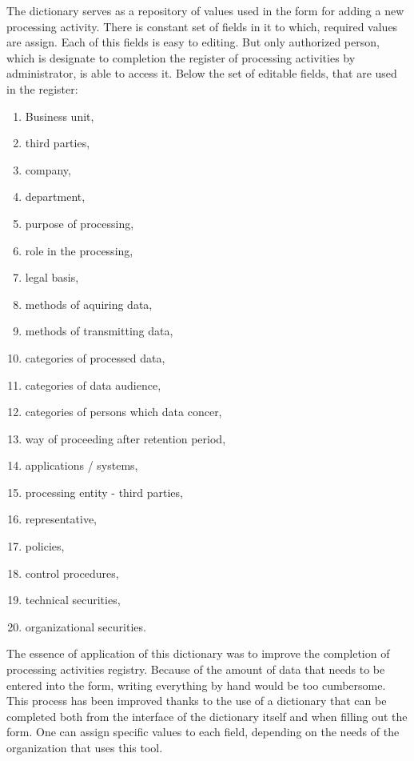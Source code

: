 \documentclass[en, noamssymb]{mgr}
\begin{document}
The dictionary serves as a repository of values used in the form for adding a new processing activity. There is constant set of fields in it to which, required values are assign. Each of this fields is easy to editing. But only authorized person, which is designate to completion the register of processing activities by administrator, is able to access it. Below the set of editable fields, that are used in the register: 

\begin{enumerate}

\item Business unit,
\item third parties,
\item company,
\item department,
\item purpose of processing,
\item role in the processing,
\item legal basis,
\item methods of aquiring data,
\item methods of transmitting data,
\item categories of processed data,
\item categories of data audience,
\item categories of persons which data concer,
\item way of proceeding after retention period,
\item applications / systems,
\item processing entity - third parties,
\item representative,
\item policies,
\item control procedures,
\item technical securities,
\item organizational securities.


\end{enumerate}

The essence of application of this dictionary was to improve the completion of processing activities registry. Because of the amount of data that needs to be entered into the form, writing everything by hand would be too cumbersome. This process has been improved thanks to the use of a dictionary that can be completed both from the interface of the dictionary itself and when filling out the form. One can assign specific values to each field, depending on the needs of the organization that uses this tool.
\end{document}
